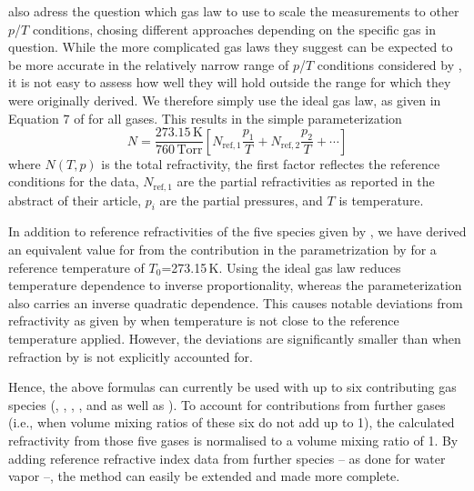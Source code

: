 \citet{newell65:_absolute_jap} also adress the question which gas law
to use to scale the measurements to other $p$/$T$ conditions, chosing different
approaches depending on the specific gas in question. While the more complicated
gas laws they suggest can be expected to be more
accurate in the relatively narrow range of $p$/$T$ conditions
considered by \citet{newell65:_absolute_jap}, it is not easy to
assess how well they will hold outside the range for which they were
originally derived. We therefore simply use the ideal gas
law, as given in Equation 7 of \citet{newell65:_absolute_jap} for all
gases. This results in the simple parameterization
\begin{equation}
  \label{eq:N_density2}
  N = \frac{273.15\,\mathrm{K}}{760\,\mathrm{Torr}}  
           \left[
           N_{\mathrm{ref},1} \frac{p_1}{T} + 
           N_{\mathrm{ref},2} \frac{p_2}{T} + \cdots
           \right]
\end{equation}
where $ N(T,p)$ is the total refractivity, the
first factor reflectes the reference conditions for the
\citet{newell65:_absolute_jap} data, $N_{\mathrm{ref},1}$ are the
partial refractivities as reported in the abstract of their
article, $p_i$ are the partial pressures, and $T$ is temperature.

In addition to reference refractivities of the five species given by
\citet{newell65:_absolute_jap}, we have derived an equivalent value for
 from the  contribution in the parametrization by
\citet{thayer74_improved_rs} for a reference temperature of $T_0$=273.15\,K.
Using the ideal gas law reduces temperature dependence to inverse
proportionality, whereas the \citet{thayer74_improved_rs} parameterization also
carries an inverse quadratic dependence. This causes notable deviations from
 refractivity as given by \citet{thayer74_improved_rs} when
temperature is not close to the reference temperature applied. However, the
deviations are significantly smaller than when refraction by  is not
explicitly accounted for.

Hence, the above formulas can currently be used with up to six contributing gas
species (, , , , and  as well
as ). To account for contributions from further gases
(i.e., when volume mixing ratios of these six do not add up to 1), the
calculated refractivity from those five gases is normalised to a volume mixing
ratio of 1. By adding reference refractive index data from further species -- as
done for water vapor --, the method can easily be extended and made more complete.

